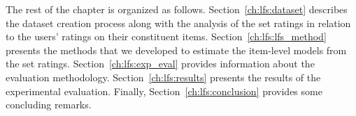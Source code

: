 The rest of the chapter is organized as follows. 
Section~\ref{ch:lfs:dataset} describes the dataset creation process
along with the analysis of the set ratings in relation to the users' ratings on
their constituent items. 
Section~\ref{ch:lfs:lfs_method} presents the methods that we developed to estimate the
item-level models from the set ratings. 
Section~\ref{ch:lfs:exp_eval} provides information about the evaluation methodology. 
Section~\ref{ch:lfs:results} presents the results of the experimental evaluation. Finally, 
Section~\ref{ch:lfs:conclusion} provides some concluding remarks.



